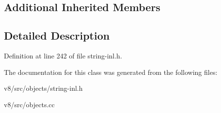 \subsection*{Additional Inherited Members}


\subsection{Detailed Description}


Definition at line 242 of file string-\/inl.\+h.



The documentation for this class was generated from the following files\+:\begin{DoxyCompactItemize}
\item 
v8/src/objects/string-\/inl.\+h\item 
v8/src/objects.\+cc\end{DoxyCompactItemize}
